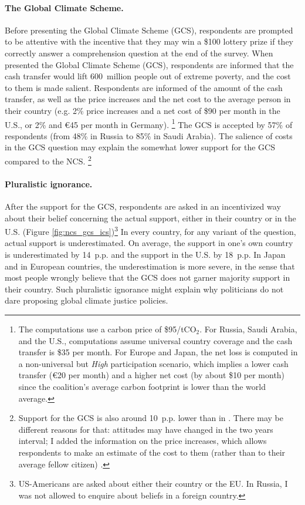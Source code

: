 \documentclass[12pt,english]{article}
\begin{document}
\begin{bibunit}
\paragraph{The Global Climate Scheme.} Before presenting the Global Climate Scheme (GCS), respondents are prompted to be attentive with the incentive that they may win a \$100 lottery prize if they correctly answer a comprehension question at the end of the survey. 
When presented the Global Climate Scheme (GCS), respondents are informed that the cash transfer would lift 600~million people out of extreme poverty, and the cost to them is made salient. Respondents are informed of the amount of the cash transfer, as well as the price increases and the net cost to the average person in their country (e.g. 2\% price increases and a net cost of \$90 per month in the U.S., or 2\% and \euro{}45 per month in Germany).%
\footnote{The computations use a carbon price of \$95/tCO$_\text{2}$. For Russia, Saudi Arabia, and the U.S., computations assume universal country coverage and the cash transfer is \$35 per month. 
For Europe and Japan, the net loss is computed in a non-universal but \textit{High} participation scenario, which implies a lower cash transfer (\euro{}20 per month) and a higher net cost (by about \$10 per month) since the coalition's average carbon footprint is lower than the world average.} 
The GCS is accepted by 57\% of respondents (from 48\% in Russia to 85\% in Saudi Arabia). The salience of costs in the GCS question may explain the somewhat lower support for the GCS compared to the NCS.%
\footnote{Support for the GCS is also around 10~p.p. lower than in \citep{fabre_majority_2025}. There may be different reasons for that: attitudes may have changed in the two years interval; I added the information on the price increases, which allows respondents to make an estimate of the cost to them (rather than to their average fellow citizen)%
.} 

\paragraph{Pluralistic ignorance.} %
After the support for the GCS, respondents are asked in an incentivized way about their belief concerning the actual support, either in their country or in the U.S. (Figure \ref{fig:ncs_gcs_ics})\footnote{US-Americans are asked about either their country or the EU. In Russia, I was not allowed to enquire about beliefs in a foreign country.} In every country, for any variant of the question, actual support is underestimated. On average, the support in one's own country is underestimated by 14~p.p. and the support in the U.S. by 18~p.p. In Japan and in European countries, the underestimation is more severe, in the sense that most people wrongly believe that the GCS does not garner majority support in their country. Such pluralistic ignorance might explain why politicians do not dare proposing global climate justice policies. %


\end{bibunit}
\end{document}
